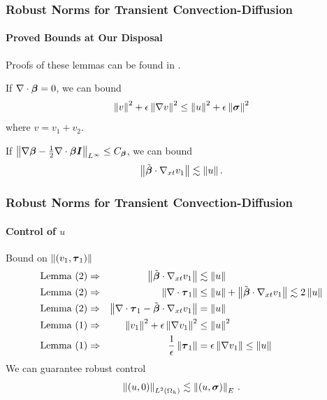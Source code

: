 \documentclass[18pt,xcolor=table]{beamer}
\begin{document}
\begin{frame}[t]
\frametitle{Robust Norms for Transient Convection-Diffusion}
\framesubtitle{Proved Bounds at Our Disposal}
Proofs of these lemmas can be found in .
\begin{lemma}[1]
If $\nabla\cdot\boldsymbol\beta=0$, we can bound
\[
\left\| v \right\|^2+\epsilon\left\| \nabla v \right\|^2\leq\left\| u \right\|^2+\epsilon\left\| \boldsymbol\sigma \right\|^2
\]
where $v=v_1+v_2$.
\end{lemma}
\begin{lemma}[2]
If $\left\| \nabla\boldsymbol\beta-\frac{1}{2}\nabla\cdot\boldsymbol\beta\boldsymbol I \right\|_{L^{\infty}}\le C_{\boldsymbol\beta}$,
we can bound
\[
\left\| \tilde{\boldsymbol\beta}\cdot\nabla_{xt} v_1 \right\|\lesssim \left\| u \right\|.
\]
\end{lemma}
\end{frame}

\begin{frame}[t]
\frametitle{Robust Norms for Transient Convection-Diffusion}
\framesubtitle{Control of $u$}
\begin{block}{Bound on $\left\| (v_1,\boldsymbol\tau_1) \right\|$}
\vspace{-2ex}
\begin{align*}
\text{Lemma (2)}\Rightarrow&&\left\| \tilde{\boldsymbol\beta}\cdot\nabla_{xt} v_1 \right\|&\lesssim\left\| u \right\|\\
\text{Lemma (2)}\Rightarrow&&\left\| \nabla\cdot\boldsymbol\tau_1 \right\|&\leq\left\| u \right\|+\left\| \tilde{\boldsymbol\beta}\cdot\nabla_{xt} v_1 \right\|\lesssim2\left\| u \right\|\\
\text{Lemma (2)}\Rightarrow&&\left\| \nabla\cdot\boldsymbol\tau_1-\tilde{\boldsymbol\beta}\cdot\nabla_{xt} v_1 \right\|&=\left\| u \right\|\\
\text{Lemma (1)}\Rightarrow&&\left\| v_1 \right\|^2+\epsilon\left\| \nabla v_1 \right\|^2&\leq\left\| u \right\|^2\\
\text{Lemma (1)}\Rightarrow&&\frac{1}{\epsilon}\left\| \boldsymbol\tau_1 \right\|&=\epsilon\left\| \nabla v_1 \right\|\leq\left\| u \right\|
\end{align*}
We can guarantee robust control
\[
\left\| (u,0) \right\|_{L^2(\Omega_h)}\lesssim\left\| (u,\boldsymbol\sigma) \right\|_E\,.
\]
\end{block}
\end{frame}
\end{document}
